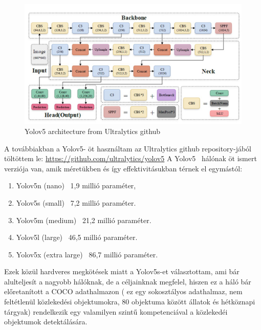 \documentclass[12pt,oneside,a4paper]{article}
\theoremstyle{remark}
\begin{document}
\begin{figure}[ht]
    \centering
    \includegraphics[width=1
    \linewidth]{architecture}
    \caption{\label{fig:architecture}Yolov5 architecture from Ultralytics github}
\end{figure}
\vspace{3mm}
\noindent A továbbiakban a Yolov5- öt használtam az Ultralytics github repository-jából töltöttem le:
\vspace{1mm}
\noindent \href{https://github.com/ultralytics/yolov5}{https://github.com/ultralytics/yolov5}
\vspace{2mm}
\noindent A Yolov5~\cite{yolov5github} hálónak öt ismert verziója van, amik méretükben és így effektivitásukban térnek
el egymástól:
\vspace{2mm}
\begin{enumerate}
\item Yolov5n (nano) ~1,9 millió paraméter,
\item Yolov5s (small) ~7,2 millió paraméter.
\item Yolov5m (medium) ~21,2 millió paraméter.
\item Yolov5l (large) ~46,5 millió paraméter.
\item Yolov5x (extra large) ~86,7 millió paraméter. \noindent
\end{enumerate}
\vspace{3mm}
\noindent Ezek közül hardveres megkötések miatt a Yolov5s-et választottam, ami bár alulteljesít a nagyobb hálóknak,
de a céljainknak megfelel, \noindent
\noindent hiszen ez a háló bár előretanított a COCO adathalmazon ( ez egy sokosztályos adathalmaz, nem feltétlenül
közlekedési objektumokra, 80 objektuma között állatok és hétköznapi tárgyak) rendelkezik egy valamilyen szintű
kompetenciával a közlekedéi objektumok detektálására.
\end{document}
